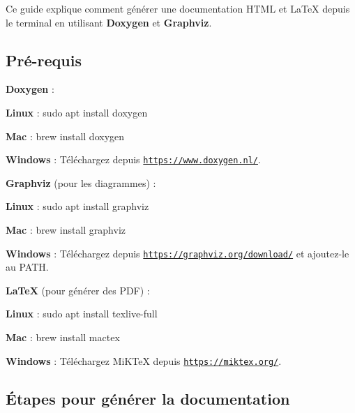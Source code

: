 Ce guide explique comment générer une documentation H\+T\+ML et La\+TeX depuis le terminal en utilisant {\bfseries Doxygen} et {\bfseries Graphviz}. 



\subsection*{Pré-\/requis}


\begin{DoxyEnumerate}
\item {\bfseries Doxygen} \+:
\begin{DoxyItemize}
\item {\bfseries Linux} \+: {\ttfamily sudo apt install doxygen}
\item {\bfseries Mac} \+: {\ttfamily brew install doxygen}
\item {\bfseries Windows} \+: Téléchargez depuis \href{https://www.doxygen.nl/}{\tt https\+://www.\+doxygen.\+nl/}.
\end{DoxyItemize}
\item {\bfseries Graphviz} (pour les diagrammes) \+:
\begin{DoxyItemize}
\item {\bfseries Linux} \+: {\ttfamily sudo apt install graphviz}
\item {\bfseries Mac} \+: {\ttfamily brew install graphviz}
\item {\bfseries Windows} \+: Téléchargez depuis \href{https://graphviz.org/download/}{\tt https\+://graphviz.\+org/download/} et ajoutez-\/le au {\ttfamily P\+A\+TH}.
\end{DoxyItemize}
\item {\bfseries La\+TeX} (pour générer des P\+DF) \+:
\begin{DoxyItemize}
\item {\bfseries Linux} \+: {\ttfamily sudo apt install texlive-\/full}
\item {\bfseries Mac} \+: {\ttfamily brew install mactex}
\item {\bfseries Windows} \+: Téléchargez Mi\+K\+TeX depuis \href{https://miktex.org/}{\tt https\+://miktex.\+org/}. 


\end{DoxyItemize}
\end{DoxyEnumerate}

\subsection*{Étapes pour générer la documentation}

